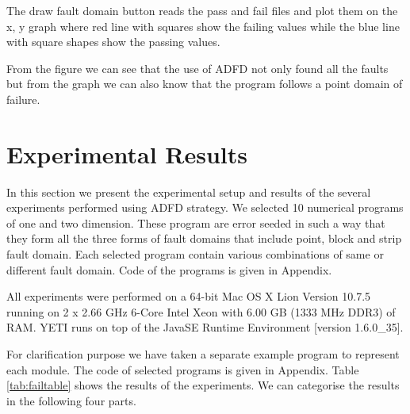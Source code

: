 \documentclass{acm_proc_article-sp}
\begin{document}
The draw fault domain button reads the pass and fail files and plot them on the x, y graph where red line with squares show the failing values while the blue line with square shapes show the passing values.

From the figure {} we can see that the use of ADFD not only found all the faults but from the graph we can also know that the program follows a point domain of failure.





\section{Experimental Results} \label{sec:experimentalResults}
In this section we present the experimental setup and results of the several experiments performed using ADFD strategy. We selected 10 numerical programs of one and two dimension. These program are error seeded in such a way that they form all the three forms of fault domains that include point, block and strip fault domain. Each selected program contain various combinations of same or different fault domain. Code of the programs is given in Appendix. 

All experiments were performed on a 64-bit Mac OS X Lion Version 10.7.5 running on 2 x 2.66 GHz 6-Core Intel Xeon with 6.00 GB (1333 MHz DDR3) of RAM. YETI runs on top of the Java\texttrademark  SE Runtime Environment [version 1.6.0\_35]. 

For clarification purpose we have taken a separate example program to represent each module. The code of selected programs is given in Appendix. Table \ref{tab:failtable} shows the results of the experiments. We can categorise the results in the following four parts.
\end{document}
